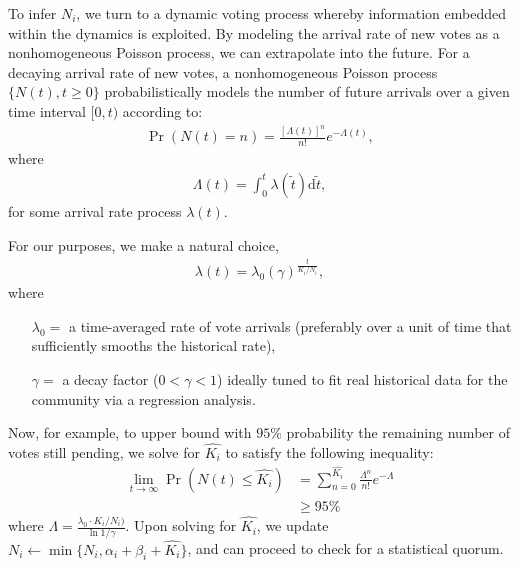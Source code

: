 \documentclass[chi_draft]{sigchi}
\begin{document}
To infer $N_i$, we turn to a dynamic voting process whereby information embedded within the dynamics is exploited.  By modeling the arrival rate of new votes as a nonhomogeneous Poisson process, we can extrapolate into the future.  For a decaying arrival rate of new votes, a nonhomogeneous Poisson process $\{N(t),t\geq 0\}$ probabilistically models the number of future arrivals over a given time interval $[0,t)$ according to:
\begin{align*}
\Pr(N(t)=n)={\frac {[\Lambda (t)]^{n}}{n!}}e^{-\Lambda (t)},
\end{align*}
where
\begin{align*}
\Lambda (t)=\int _{0}^{t}\lambda (\tilde{t})\mathrm{d}\tilde{t},
\end{align*}
for some arrival rate process $\lambda (t)$.

For our purposes, we make a natural choice,
\begin{align}\label{eq6}
\lambda (t) = \lambda_0 {(\gamma)}^{\frac{t}{K_i/N_i}},
\end{align}
where
\begin{description}
\begin{itemize}
\item[$\lambda_0 =$] a time-averaged rate of vote arrivals (preferably over a unit of time that sufficiently smooths the historical rate),
\item[$\gamma =$] a decay factor ($0 < \gamma < 1$) ideally tuned to fit real historical data for the community via a regression analysis.
\end{itemize}
\end{description}
Now, for example, to upper bound with $95\%$ probability the remaining number of votes still pending, we solve for $\hat{K_i}$ to satisfy the following inequality:
\begin{align}\label{eq7}
\lim_{t\rightarrow \infty}\Pr\left(N(t)\leq \hat{K_i}\right) & = \sum_{n=0}^{\hat{K_i}} \frac{\Lambda^n}{n!}e^{-\Lambda}\\
& \geq 95\% \nonumber
\end{align}
where $\Lambda = \frac{\lambda_0 \cdot K_i/N_i)}{\ln{1/\gamma}}$.
Upon solving for $\hat{K_i}$, we update $N_i \leftarrow \min\{N_i,\alpha_i + \beta_i + \hat{K_i}\}$, and can proceed to check for a statistical quorum.


\end{document}
